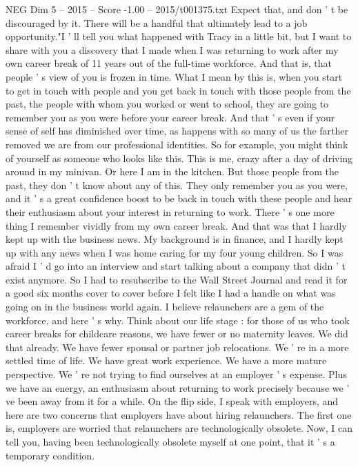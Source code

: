 \begin{textsample}{NEG Dim 5 – 2015 – Score -1.00 – 2015/t001375.txt}
Expect that, and don ' t be discouraged by it.
There will be a handful that ultimately lead to a job opportunity."I ' ll tell you what happened with Tracy in a little bit, but I want to share with you a discovery that I made when I was returning to work after my own career break of 11 years out of the full-time workforce.
And that is, that people ' s view of you is frozen in time.
What I mean by this is, when you start to get in touch with people and you get back in touch with those people from the past, the people with whom you worked or went to school, they are going to remember you as you were before your career break.
And that ' s even if your sense of self has diminished over time, as happens with so many of us the farther removed we are from our professional identities.
So for example, you might think of yourself as someone who looks like this.
This is me, crazy after a day of driving around in my minivan.
Or here I am in the kitchen.
But those people from the past, they don ' t know about any of this.
They only remember you as you were, and it ' s a great confidence boost to be back in touch with these people and hear their enthusiasm about your interest in returning to work.
There ' s one more thing I remember vividly from my own career break.
And that was that I hardly kept up with the business news.
My background is in finance, and I hardly kept up with any news when I was home caring for my four young children.
So I was afraid I ' d go into an interview and start talking about a company that didn ' t exist anymore.
So I had to resubscribe to the Wall Street Journal and read it for a good six months cover to cover before I felt like I had a handle on what was going on in the business world again.
I believe relaunchers are a gem of the workforce, and here ' s why.
Think about our life stage : for those of us who took career breaks for childcare reasons, we have fewer or no maternity leaves.
We did that already.
We have fewer spousal or partner job relocations.
We ' re in a more settled time of life.
We have great work experience.
We have a more mature perspective.
We ' re not trying to find ourselves at an employer ' s expense.
Plus we have an energy, an enthusiasm about returning to work precisely because we ' ve been away from it for a while.
On the flip side, I speak with employers, and here are two concerns that employers have about hiring relaunchers.
The first one is, employers are worried that relaunchers are technologically obsolete.
Now, I can tell you, having been technologically obsolete myself at one point, that it ' s a temporary condition.

\end{textsample}
